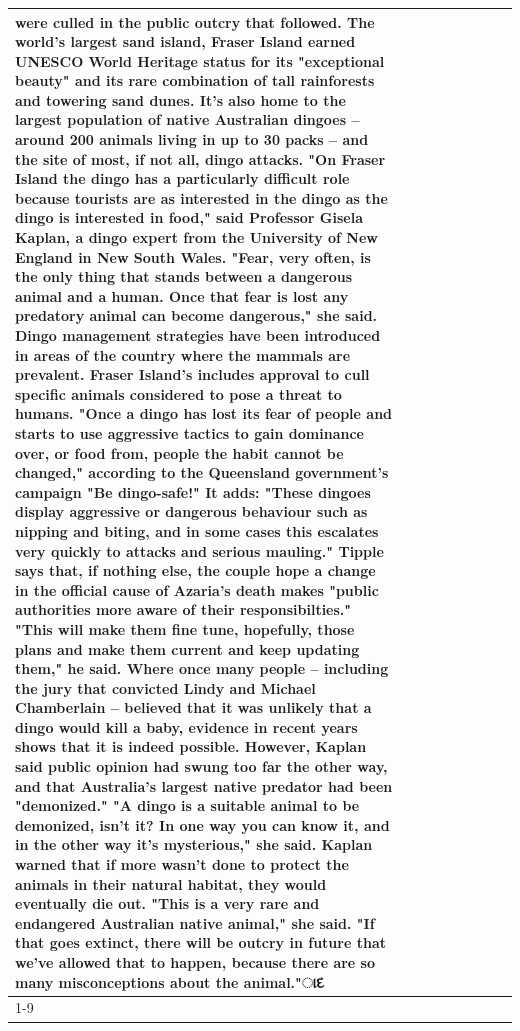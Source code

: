 \begin{table}[H]
\begin{tabular}{lllrlllll}
were culled in the public outcry that followed. The world's largest sand island, Fraser Island earned UNESCO World Heritage status for its "exceptional beauty" and its rare combination of tall rainforests and towering sand dunes. It's also home to the largest population of native Australian dingoes -- around 200 animals living in up to 30 packs -- and the site of most, if not all, dingo attacks. "On Fraser Island the dingo has a particularly difficult role because tourists are as interested in the dingo as the dingo is interested in food," said Professor Gisela Kaplan, a dingo expert from the University of New England in New South Wales. "Fear, very often, is the only thing that stands between a dangerous animal and a human. Once that fear is lost any predatory animal can become dangerous," she said. Dingo management strategies have been introduced in areas of the country where the mammals are prevalent. Fraser Island's includes approval to cull specific animals considered to pose a threat to humans. "Once a dingo has lost its fear of people and starts to use aggressive tactics to gain dominance over, or food from, people the habit cannot be changed," according to the Queensland government's campaign "Be dingo-safe!" It adds: "These dingoes display aggressive or dangerous behaviour such as nipping and biting, and in some cases this escalates very quickly to attacks and serious mauling." Tipple says that, if nothing else, the couple hope a change in the official cause of Azaria's death makes "public authorities more aware of their responsibilties." "This will make them fine tune, hopefully, those plans and make them current and keep updating them," he said. Where once many people -- including the jury that convicted Lindy and Michael Chamberlain -- believed that it was unlikely that a dingo would kill a baby, evidence in recent years shows that it is indeed possible. However, Kaplan said public opinion had swung too far the other way, and that Australia's largest native predator had been "demonized." "A dingo is a suitable animal to be demonized, isn't it? In one way you can know it, and in the other way it's mysterious," she said. Kaplan warned that if more wasn't done to protect the animals in their natural habitat, they would eventually die out. "This is a very rare and endangered Australian native animal," she said. "If that goes extinct, there will be outcry in future that we've allowed that to happen, because there are so many misconceptions about the animal."ાદ \\
\cline{1-9}

\end{tabular}
\end{table}
